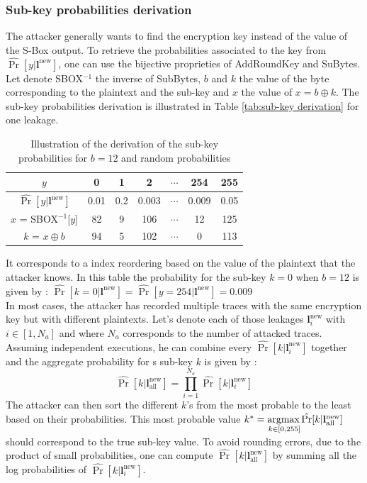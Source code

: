 \subsubsection{Sub-key probabilities derivation}
The attacker generally wants to find the encryption key instead of the 
value of the S-Box output. To retrieve the probabilities associated to the 
key from $\hat{\Pr}[y|\mathbf{l}^{\text{new}}]$, one can use the bijective 
proprieties of AddRoundKey and SuBytes. Let denote SBOX$^{-1}$ the inverse 
of SubBytes, $b$ and $k$ the value of the byte corresponding to the 
plaintext and the sub-key and $x$ the value of $x = b\oplus k$. The 
sub-key probabilities derivation is illustrated in Table \ref{tab:sub-key 
derivation} for one leakage.  
\begin{table}[ht]
    \centering
    \renewcommand{\arraystretch}{1.5}
    \begin{tabular}{|c|c|c|c|c|c|c|}
        \hline
         $y$ & 0 & 1 & 2 & $\cdots$ & 254 & 255  \\\hline
         $\hat{\Pr}[y|\mathbf{l}^{\text{new}}]$ & 0.01 & 0.2 & 0.003 & 
$\cdots$ & 0.009 & 0.05\\\hline
         $x$ = SBOX$^{-1}$[$y$] & 82 & 9 & 106  & $\cdots$ & 12 & 125\\ 
\hline
         $k$ = $x \oplus b$ & 94 & 5 & 102 & $\cdots$ & 0 & 113\\ \hline    
    \end{tabular}
    \caption{Illustration of the derivation of the sub-key probabilities 
for $b=12$ and random probabilities}
    \label{tab:sub-key derivation}
\end{table}
It corresponds to a index reordering based on the value of the plaintext 
that the attacker knows. In this table the probability for the sub-key 
$k=0$ when $b=12$ is given by : $\hat{\Pr}[k=0|\mathbf{l}^{\text{new}}]= 
\hat{\Pr}[y=254|\mathbf{l}^{\text{new}}]=0.009$\\

In most cases, the attacker has recorded multiple traces with the same 
encryption key but with different plaintexts. Let's denote each of those 
leakages $\mathbf{l}^{\text{new}}_i$ with $i \in [1, N_a]$ and where $N_a$ 
corresponds to the number of attacked traces. Assuming independent 
executions, he can combine every $\hat{\Pr}[k|\mathbf{l}^{\text{new}}_i]$ 
together and the aggregate probability for s sub-key $k$ is given by :
\begin{equation*}
    \hat{\Pr}[k|\mathbf{l}^{\text{new}}_{\text{all}}] = 
\prod_{i=1}^{N_a}\hat{\Pr}[k|\mathbf{l}^{\text{new}}_i]
\end{equation*}
The attacker can then sort the different $k$'s from the most probable to 
the least based on their probabilities. This most probable value $k^* 
=\underset{k\in[0,255]}{\operatorname*{argmax\,}}\hat{\Pr}[k|\mathbf{l}^{\text{new}}_{\text{all}}]$ 
should correspond to the true sub-key value. To avoid rounding errors, due 
to the product of small probabilities, one can compute 
$\hat{\Pr}[k|\mathbf{l}^{\text{new}}_{\text{all}}]$ by summing all the log 
probabilities of $\hat{\Pr}[k|\mathbf{l}^{\text{new}}_i]$.

